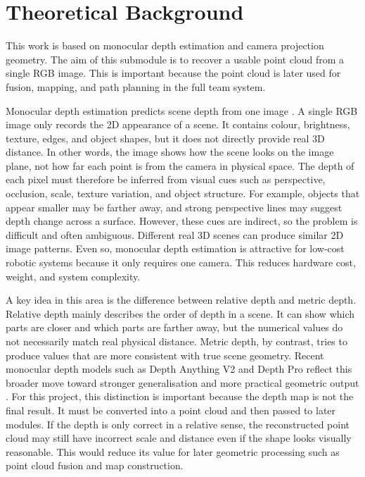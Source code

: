 \documentclass{article}
\begin{document}
\section{Theoretical Background}

This work is based on monocular depth estimation and camera projection geometry. The aim of this submodule is to recover a usable point cloud from a single RGB image. This is important because the point cloud is later used for fusion, mapping, and path planning in the full team system.

Monocular depth estimation predicts scene depth from one image \cite{godard2019}. A single RGB image only records the 2D appearance of a scene. It contains colour, brightness, texture, edges, and object shapes, but it does not directly provide real 3D distance. In other words, the image shows how the scene looks on the image plane, not how far each point is from the camera in physical space. The depth of each pixel must therefore be inferred from visual cues such as perspective, occlusion, scale, texture variation, and object structure. For example, objects that appear smaller may be farther away, and strong perspective lines may suggest depth change across a surface. However, these cues are indirect, so the problem is difficult and often ambiguous. Different real 3D scenes can produce similar 2D image patterns. Even so, monocular depth estimation is attractive for low-cost robotic systems because it only requires one camera. This reduces hardware cost, weight, and system complexity.

A key idea in this area is the difference between relative depth and metric depth. Relative depth mainly describes the order of depth in a scene. It can show which parts are closer and which parts are farther away, but the numerical values do not necessarily match real physical distance. Metric depth, by contrast, tries to produce values that are more consistent with true scene geometry. Recent monocular depth models such as Depth Anything V2 and Depth Pro reflect this broader move toward stronger generalisation and more practical geometric output \cite{yang2024,bochkovskii2024}. For this project, this distinction is important because the depth map is not the final result. It must be converted into a point cloud and then passed to later modules. If the depth is only correct in a relative sense, the reconstructed point cloud may still have incorrect scale and distance even if the shape looks visually reasonable. This would reduce its value for later geometric processing such as point cloud fusion and map construction.
\end{document}

